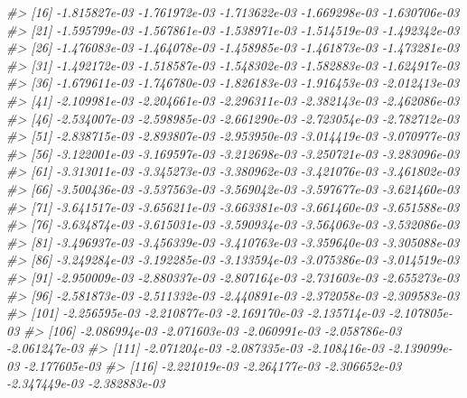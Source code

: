 \documentclass[
]{article}
\newenvironment{Shaded}{\begin{snugshade}}{\end{snugshade}}
\newcommand{\CommentTok}[1]{\textcolor[rgb]{0.56,0.35,0.01}{\textit{#1}}}
\begin{document}
\begin{Shaded}
\begin{Highlighting}[]
\CommentTok{\#\textgreater{}  [16] {-}1.815827e{-}03 {-}1.761972e{-}03 {-}1.713622e{-}03 {-}1.669298e{-}03 {-}1.630706e{-}03}
\CommentTok{\#\textgreater{}  [21] {-}1.595799e{-}03 {-}1.567861e{-}03 {-}1.538971e{-}03 {-}1.514519e{-}03 {-}1.492342e{-}03}
\CommentTok{\#\textgreater{}  [26] {-}1.476083e{-}03 {-}1.464078e{-}03 {-}1.458985e{-}03 {-}1.461873e{-}03 {-}1.473281e{-}03}
\CommentTok{\#\textgreater{}  [31] {-}1.492172e{-}03 {-}1.518587e{-}03 {-}1.548302e{-}03 {-}1.582883e{-}03 {-}1.624917e{-}03}
\CommentTok{\#\textgreater{}  [36] {-}1.679611e{-}03 {-}1.746780e{-}03 {-}1.826183e{-}03 {-}1.916453e{-}03 {-}2.012413e{-}03}
\CommentTok{\#\textgreater{}  [41] {-}2.109981e{-}03 {-}2.204661e{-}03 {-}2.296311e{-}03 {-}2.382143e{-}03 {-}2.462086e{-}03}
\CommentTok{\#\textgreater{}  [46] {-}2.534007e{-}03 {-}2.598985e{-}03 {-}2.661290e{-}03 {-}2.723054e{-}03 {-}2.782712e{-}03}
\CommentTok{\#\textgreater{}  [51] {-}2.838715e{-}03 {-}2.893807e{-}03 {-}2.953950e{-}03 {-}3.014419e{-}03 {-}3.070977e{-}03}
\CommentTok{\#\textgreater{}  [56] {-}3.122001e{-}03 {-}3.169597e{-}03 {-}3.212698e{-}03 {-}3.250721e{-}03 {-}3.283096e{-}03}
\CommentTok{\#\textgreater{}  [61] {-}3.313011e{-}03 {-}3.345273e{-}03 {-}3.380962e{-}03 {-}3.421076e{-}03 {-}3.461802e{-}03}
\CommentTok{\#\textgreater{}  [66] {-}3.500436e{-}03 {-}3.537563e{-}03 {-}3.569042e{-}03 {-}3.597677e{-}03 {-}3.621460e{-}03}
\CommentTok{\#\textgreater{}  [71] {-}3.641517e{-}03 {-}3.656211e{-}03 {-}3.663381e{-}03 {-}3.661460e{-}03 {-}3.651588e{-}03}
\CommentTok{\#\textgreater{}  [76] {-}3.634874e{-}03 {-}3.615031e{-}03 {-}3.590934e{-}03 {-}3.564063e{-}03 {-}3.532086e{-}03}
\CommentTok{\#\textgreater{}  [81] {-}3.496937e{-}03 {-}3.456339e{-}03 {-}3.410763e{-}03 {-}3.359640e{-}03 {-}3.305088e{-}03}
\CommentTok{\#\textgreater{}  [86] {-}3.249284e{-}03 {-}3.192285e{-}03 {-}3.133594e{-}03 {-}3.075386e{-}03 {-}3.014519e{-}03}
\CommentTok{\#\textgreater{}  [91] {-}2.950009e{-}03 {-}2.880337e{-}03 {-}2.807164e{-}03 {-}2.731603e{-}03 {-}2.655273e{-}03}
\CommentTok{\#\textgreater{}  [96] {-}2.581873e{-}03 {-}2.511332e{-}03 {-}2.440891e{-}03 {-}2.372058e{-}03 {-}2.309583e{-}03}
\CommentTok{\#\textgreater{} [101] {-}2.256595e{-}03 {-}2.210877e{-}03 {-}2.169170e{-}03 {-}2.135714e{-}03 {-}2.107805e{-}03}
\CommentTok{\#\textgreater{} [106] {-}2.086994e{-}03 {-}2.071603e{-}03 {-}2.060991e{-}03 {-}2.058786e{-}03 {-}2.061247e{-}03}
\CommentTok{\#\textgreater{} [111] {-}2.071204e{-}03 {-}2.087335e{-}03 {-}2.108416e{-}03 {-}2.139099e{-}03 {-}2.177605e{-}03}
\CommentTok{\#\textgreater{} [116] {-}2.221019e{-}03 {-}2.264177e{-}03 {-}2.306652e{-}03 {-}2.347449e{-}03 {-}2.382883e{-}03}

\end{Highlighting}
\end{Shaded}
\end{document}
